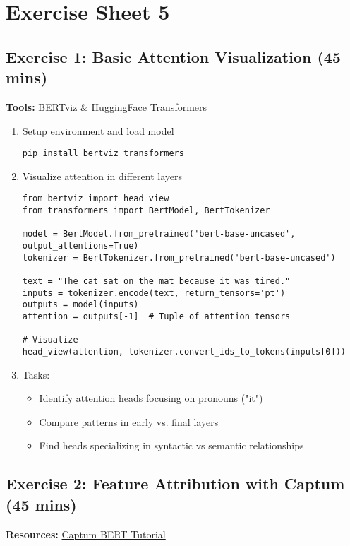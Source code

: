 \chapter*{Exercise Sheet 5}
\section*{Exercise 1: Basic Attention Visualization (45 mins)}
\textbf{Tools:} BERTviz \& HuggingFace Transformers

\begin{enumerate}
\item Setup environment and load model
\begin{verbatim}
pip install bertviz transformers
\end{verbatim}

\item Visualize attention in different layers
\begin{verbatim}
from bertviz import head_view
from transformers import BertModel, BertTokenizer

model = BertModel.from_pretrained('bert-base-uncased', output_attentions=True)
tokenizer = BertTokenizer.from_pretrained('bert-base-uncased')

text = "The cat sat on the mat because it was tired."
inputs = tokenizer.encode(text, return_tensors='pt')
outputs = model(inputs)
attention = outputs[-1]  # Tuple of attention tensors

# Visualize
head_view(attention, tokenizer.convert_ids_to_tokens(inputs[0]))
\end{verbatim}

\item Tasks:
\begin{itemize}
\item Identify attention heads focusing on pronouns ("it")
\item Compare patterns in early vs. final layers
\item Find heads specializing in syntactic vs semantic relationships
\end{itemize}
\end{enumerate}

\section*{Exercise 2: Feature Attribution with Captum (45 mins)}
\textbf{Resources:} \href{https://captum.ai/tutorials/Bert_SQUAD_Interpret}{Captum BERT Tutorial}

